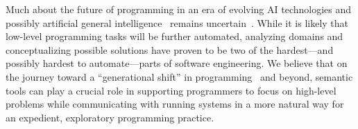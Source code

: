 \ParSep

Much about the future of programming in an era of evolving AI technologies and possibly artificial general intelligence~\cite{bubeck2023sparks} remains uncertain~\cite{tanimoto2023five}.
While it is likely that low-level programming tasks will be further automated, analyzing domains and conceptualizing possible solutions have proven to be two of the hardest---and possibly hardest to automate---parts of software engineering.
We believe that on the journey toward a ``generational shift'' in programming~\cite{sarkar2023code} and beyond, semantic tools can play a crucial role in supporting programmers to focus on high-level problems while communicating with running systems in a more natural way for an expedient, exploratory programming practice.
